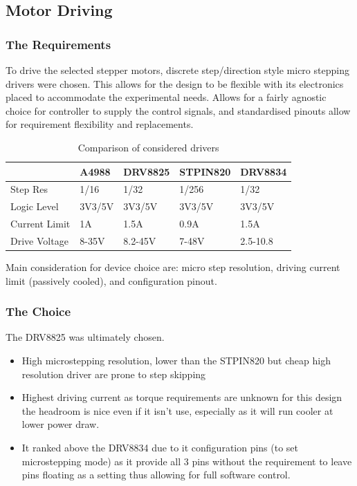\subsection{Motor Driving}

\subsubsection*{The Requirements}
To drive the selected stepper motors, discrete step/direction style micro stepping drivers were chosen. This allows for the design to be flexible with its electronics placed to accommodate the experimental needs. Allows for a fairly agnostic choice for controller to supply the control signals, and standardised pinouts allow for requirement flexibility and replacements.

\begin{table}[h]
    \centering
    \begin{tabular}{|l|l|l|l|l|}
        \hline
        \textbf{}     & \textbf{A4988} & \textbf{DRV8825} & \textbf{STPIN820} & \textbf{DRV8834} \\ \hline
        Step Res      & 1/16           & 1/32             & 1/256             & 1/32             \\ \hline
        Logic Level   & 3V3/5V         & 3V3/5V           & 3V3/5V            & 3V3/5V           \\ \hline
        Current Limit & 1A             & 1.5A             & 0.9A              & 1.5A             \\ \hline
        Drive Voltage & 8-35V          & 8.2-45V          & 7-48V             & 2.5-10.8         \\ \hline
    \end{tabular}
    \caption{Comparison of considered drivers}
\end{table}

Main consideration for device choice are: micro step resolution, driving current limit (passively cooled), and configuration pinout.

\subsubsection*{The Choice}
The DRV8825 was ultimately chosen.
\begin{itemize}
    \item High microstepping resolution, lower than the STPIN820 but cheap high resolution driver are prone to step skipping \cite{step_book}
    \item Highest driving current as torque requirements are unknown for this design the headroom is nice even if it isn't use, especially as it will run cooler at lower power draw.
    \item It ranked above the DRV8834 due to it configuration pins (to set microstepping mode) as it provide all 3 pins without the requirement to leave pins floating as a setting thus allowing for full software control.
\end{itemize}

